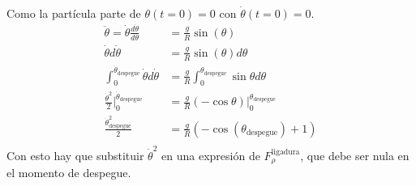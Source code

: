 \documentclass[11pt, spanish, a4paper, twoside]{article}
\begin{document}
\begin{enumerate}
	Como la partícula parte de $\theta(t=0) = 0$ con $\dot{\theta}(t=0) = 0$.
	$$
	\begin{aligned}
		\ddot{\theta} = \dot{\theta} \frac{d \dot{\theta}}{d \theta}
		&= \frac{g}{R} \sin(\theta)\\
		\dot{\theta} d \dot{\theta}
		&= \frac{g}{R} \sin(\theta) d \theta \\
		\int_0^{\dot{\theta}_\mathrm{despegue}} \dot{\theta} d \dot{\theta}
		&= \frac{g}{R} \int_0^{\theta_\mathrm{despegue}} \sin{\theta} d \theta\\
		\frac{\dot{\theta}^2}{2} \bigg|_0^{\dot{\theta}_\mathrm{despegue}}
		&= \frac{g}{R} (-\cos{\theta}) \bigg|_0^{\theta_\mathrm{despegue}}\\
		\frac{\dot{\theta}_\mathrm{despegue}^2}{2}
		&= \frac{g}{R} (-\cos(\theta_\mathrm{despegue}) + 1)\\
	\end{aligned}
	$$
	Con esto hay que substituir $\dot{\theta}^2$ en una expresión de $F^\mathrm{ligadura}_{\rho}$, que debe ser nula en el momento de despegue.


\end{enumerate}
\end{document}
